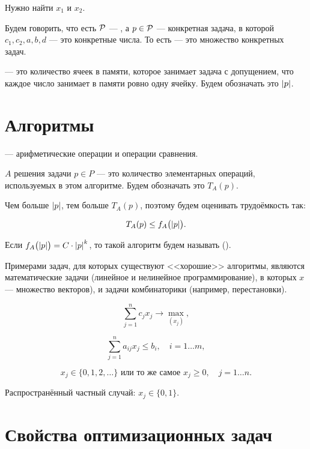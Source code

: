 Нужно найти $x_1$ и $x_2$.


Будем говорить, что есть $\P$ --- , а $p \in \P$ --- конкретная задача, в которой $c_1, c_2, a, b, d$ --- это конкретные числа. То есть  --- это множество конкретных задач.


 --- это количество ячеек в памяти, которое занимает задача с допущением, что каждое число занимает в памяти ровно одну ячейку. Будем обозначать это $\abs{p}$.

\section{Алгоритмы}


 --- арифметические операции и операции сравнения.


 $A$ решения задачи $p \in P$ --- это количество элементарных операций, используемых в этом алгоритме. Будем обозначать это $T_A(p)$.

\remark

Чем больше $\abs{p}$, тем больше $T_A(p)$, поэтому будем оценивать трудоёмкость так:

\[T_A(p) \le f_A\big(\abs{p}\big).\]


Если $f_A\big(\abs{p}\big) = C \cdot \abs{p}^k$, то такой алгоритм будем называть  ().

Примерами задач, для которых существуют <<хорошие>> алгоритмы, являются математические задачи (линейное и нелинейное программирование), в которых $x$ --- множество векторов), и задачи комбинаторики (например, перестановки).


\[\sum_{j=1}^{n} c_j x_j \to \max_{(x_j)},\]

\[\sum_{j=1}^{n}a_{ij} x_j \le b_i, \quad i = 1\dots m,\]

\[x_j \in \{0, 1, 2, \dots\} \text{ или то же самое } x_j \ge 0, \quad j = 1\dots n.\]

Распространённый частный случай: $x_j \in \{0, 1\}$.

\section{Свойства оптимизационных задач}

